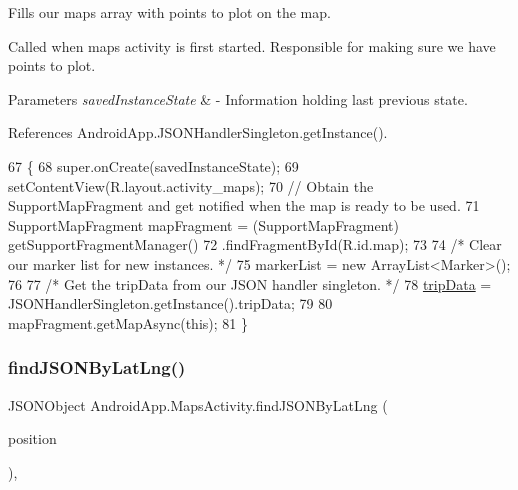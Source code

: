 Fills our maps array with points to plot on the map. 

Called when maps activity is first started. Responsible for making sure we have points to plot.


\begin{DoxyParams}{Parameters}
{\em saved\+Instance\+State} & -\/ Information holding last previous state. \\
\hline
\end{DoxyParams}


References Android\+App.\+J\+S\+O\+N\+Handler\+Singleton.\+get\+Instance().


\begin{DoxyCode}
67                                                        \{
68         super.onCreate(savedInstanceState);
69         setContentView(R.layout.activity\_maps);
70         \textcolor{comment}{// Obtain the SupportMapFragment and get notified when the map is ready to be used.}
71         SupportMapFragment mapFragment = (SupportMapFragment) getSupportFragmentManager()
72                 .findFragmentById(R.id.map);
73 
74         \textcolor{comment}{/* Clear our marker list for new instances. */}
75         markerList = \textcolor{keyword}{new} ArrayList<Marker>();
76 
77         \textcolor{comment}{/* Get the tripData from our JSON handler singleton. */}
78         \hyperlink{class_android_app_1_1_maps_activity_ad2fa23bd9f7f5a501e91329413608528}{tripData} = JSONHandlerSingleton.getInstance().tripData;
79 
80         mapFragment.getMapAsync(\textcolor{keyword}{this});
81     \}
\end{DoxyCode}
\mbox{\label{class_android_app_1_1_maps_activity_a18364d9334710362b1e6c39502353927}} 
\subsubsection{\texorpdfstring{find\+J\+S\+O\+N\+By\+Lat\+Lng()}{findJSONByLatLng()}}
{\footnotesize\ttfamily J\+S\+O\+N\+Object Android\+App.\+Maps\+Activity.\+find\+J\+S\+O\+N\+By\+Lat\+Lng (\begin{DoxyParamCaption}\item[{Lat\+Lng}]{position }\end{DoxyParamCaption})\hspace{0.3cm}{\ttfamily [inline]}, {\ttfamily [private]}}



